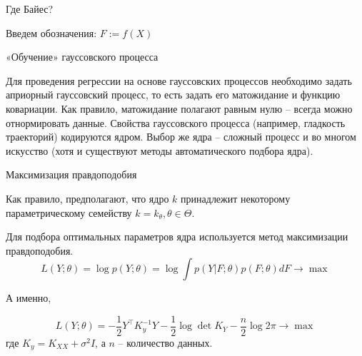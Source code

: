 \documentclass[fullscreen=true, bookmarks=true, hyperref={pdfencoding=unicode}]{beamer}
\begin{document}
\begin{frame}{Где Байес?}

    Введем обозначения: $F := f(X)$

    \vfill






\end{frame}

\begin{frame}{«Обучение» гауссовского процесса}

   Для проведения регрессии на основе гауссовских процессов необходимо задать априорный гауссовский процесс, то есть задать его матожидание и функцию ковариации. Как правило, матожидание полагают равным нулю -- всегда можно отнормировать данные. Свойства гауссовского процесса (например, гладкость траекторий) кодируются ядром. Выбор же ядра -- сложный процесс и во многом искусство (хотя и существуют методы автоматического подбора ядра).

\end{frame}

\begin{frame}{Максимизация правдоподобия}

    Как правило, предполагают, что ядро $k$ принадлежит некоторому параметрическому семейству $k = k_\theta, \theta \in \Theta$.

    \pause

    Для подбора оптимальных параметров ядра используется метод максимизации правдоподобия.
    $$L(Y; \theta) = \log p(Y; \theta) = \log \int p(Y | F; \theta) p(F; \theta) dF \longrightarrow \max $$

    \pause
    А именно,

    $$ L(Y; \theta) = -\frac 1 2 Y^\top K_y^{-1} Y - \frac 1 2 \log \det K_Y - \frac n 2 \log 2 \pi \longrightarrow \max$$
    где $K_y = K_{XX} + \sigma^2 I$, а $n$ -- количество данных.

\end{frame}
\end{document}
